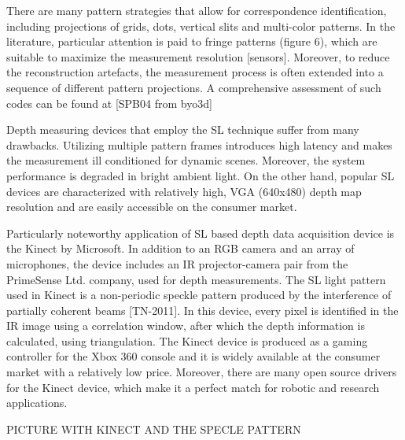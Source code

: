 	There are many pattern strategies that allow for correspondence identification, including projections of grids, dots, vertical slits and multi-color patterns. In the literature, particular attention is paid to fringe patterns (figure 6), which are suitable to maximize the measurement resolution [sensors]. Moreover, to reduce the reconstruction artefacts, the measurement process is often extended into a sequence of different pattern projections. A comprehensive assessment of such codes can be found at [SPB04 from byo3d]
	
	Depth measuring devices that employ the SL technique suffer from many drawbacks. Utilizing multiple pattern frames introduces high latency and makes the measurement ill conditioned for dynamic scenes. Moreover, the system performance is degraded in bright ambient light. On the other hand, popular SL devices are characterized with relatively high, VGA (640x480) depth map resolution and are easily accessible on the consumer market.
	
	Particularly noteworthy application of SL based depth data acquisition device is the Kinect by Microsoft. In addition to an RGB camera and an array of microphones, the device includes an IR projector-camera pair from the PrimeSense Ltd. company, used for depth measurements. The SL light pattern used in Kinect is a non-periodic speckle pattern produced by the interference of partially coherent beams [TN-2011]. In this device, every pixel is identified in the IR image using a correlation window, after which the depth information is calculated, using triangulation. The Kinect device is produced as a gaming controller for the Xbox 360 console and it is widely available at the consumer market with a relatively low price. Moreover, there are many open source drivers for the Kinect device, which make it a perfect match for robotic and research applications.
	
	PICTURE WITH KINECT AND THE SPECLE PATTERN
	
